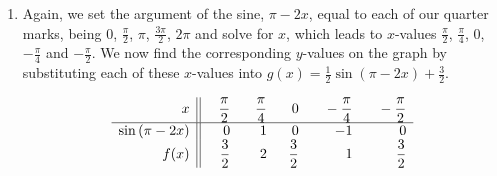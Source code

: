 \begin{example}
\begin{enumerate}
\item  Again, we set the argument of the sine, $\pi - 2x$, equal to each of our quarter marks, being  $0$, $\frac{\pi}{2}$, $\pi$, $\frac{3\pi}{2}$, $2\pi$ and  solve for $x$, which leads to $x$-values $\frac{\pi}{2}$, $\frac{\pi}{4}$, 0, $-\frac{\pi}{4}$ and $-\frac{\pi}{2}$. We now find the corresponding $y$-values on the graph by substituting each of these $x$-values into  $g(x) = \frac{1}{2} \sin(\pi - 2x) + \frac{3}{2}$.  



\renewcommand{\arraystretch}{2}
\[ \begin{array}{r||rrrrr}  
x &\hphantom{-}\dfrac{\pi}{2} & \hphantom{-}\dfrac{\pi}{4} & \hphantom{-}0 & \hphantom{-}-\dfrac{\pi}{4} & \hphantom{-}-\dfrac{\pi}{2} \\[0.1cm] \hline
\sin\left(\pi - 2x\right) & 0 & 1 & 0 & -1 & 0 \\ 
f(x) & \dfrac{3}{2} & 2 & \dfrac{3}{2} & 1 & \dfrac{3}{2} \\ 
\end{array} \]



\end{enumerate}
\end{example}
